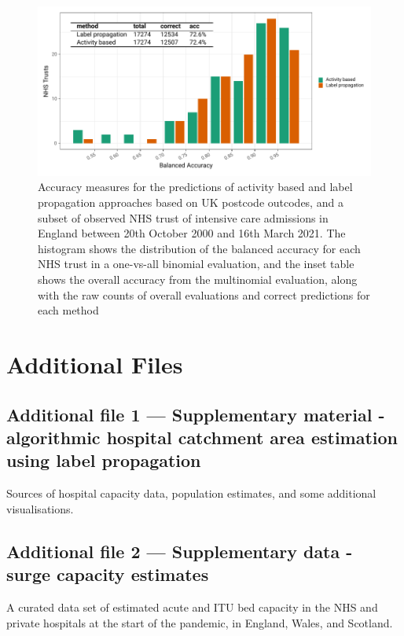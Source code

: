 \documentclass[twocolumn]{bmcart}%
\begin{document}
\begin{backmatter}
\begin{figure}[h!]
  \includegraphics{FIG5_sari_accuracy_comparison} 
  \caption{Accuracy measures for the predictions of activity based and label propagation approaches based on UK 
postcode 
outcodes, and a subset of observed NHS trust of intensive care admissions in England between 20th October 2000 and 16th 
March 2021. The histogram shows the distribution of the balanced accuracy for each NHS trust in a one-vs-all binomial 
evaluation, and the inset table shows the overall accuracy from the multinomial evaluation, along with the raw counts 
of 
overall evaluations and correct predictions for each method}
  \label{fig:five}
\end{figure}


\section*{Additional Files}
  \subsection*{Additional file 1 --- Supplementary material - algorithmic hospital catchment area estimation using 
label propagation}
    Sources of hospital capacity data, population estimates,  and some additional visualisations.

  \subsection*{Additional file 2 --- Supplementary data - surge capacity estimates}
    A curated data set of estimated acute and ITU bed capacity in the NHS and private hospitals at the start of the 
pandemic, in England, Wales, and Scotland.

\end{backmatter}
\end{document}
